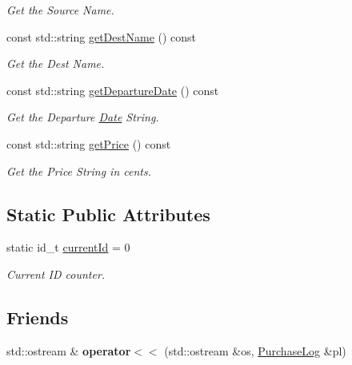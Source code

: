 \begin{DoxyCompactItemize}
\begin{DoxyCompactList}\small\item\em Get the Source Name. \end{DoxyCompactList}\item 
const std\+::string \mbox{\hyperlink{classPurchaseLog_a1ced321455e51202b4fbc962a2ab4398}{get\+Dest\+Name}} () const
\begin{DoxyCompactList}\small\item\em Get the Dest Name. \end{DoxyCompactList}\item 
const std\+::string \mbox{\hyperlink{classPurchaseLog_a55fd3400a7c03a09a276bfc015f75415}{get\+Departure\+Date}} () const
\begin{DoxyCompactList}\small\item\em Get the Departure \mbox{\hyperlink{classDate}{Date}} String. \end{DoxyCompactList}\item 
const std\+::string \mbox{\hyperlink{classPurchaseLog_a5fc1010f824f9ce26c309f9682d1b5ff}{get\+Price}} () const
\begin{DoxyCompactList}\small\item\em Get the Price String in cents. \end{DoxyCompactList}\end{DoxyCompactItemize}
\subsection*{Static Public Attributes}
\begin{DoxyCompactItemize}
\item 
static id\+\_\+t \mbox{\hyperlink{classPurchaseLog_a175b76f4fd112806badc0ea294bccca5}{current\+Id}} = 0
\begin{DoxyCompactList}\small\item\em Current ID counter. \end{DoxyCompactList}\end{DoxyCompactItemize}
\subsection*{Friends}
\begin{DoxyCompactItemize}
\item 
\mbox{\label{classPurchaseLog_a49c8f4f31115140c5700334bd9933525}} 
std\+::ostream \& {\bfseries operator$<$$<$} (std\+::ostream \&os, \mbox{\hyperlink{classPurchaseLog}{Purchase\+Log}} \&pl)
\end{DoxyCompactItemize}



